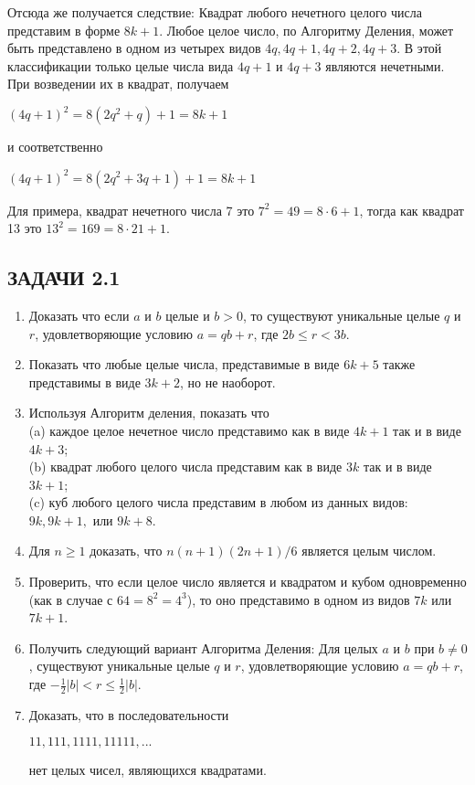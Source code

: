 \documentclass[11pt]{article}
\begin{document}
\qquad \quad Отсюда же получается следствие: Квадрат любого нечетного целого числа представим в форме $8k+1$. Любое целое число, по Алгоритму Деления, может быть представлено в одном из четырех видов $4q, 4q+1, 4q+2, 4q+3$. В этой классификации только целые числа вида $4q+1$ и $4q+3$ являются нечетными. При возведении их в квадрат, получаем
\begin{center}
	$(4q+1)^2=8(2q^2+q)+1=8k+1$
\end{center}
и соответственно
\begin{center}
	$(4q+1)^2=8(2q^2+3q+1)+1=8k+1$
\end{center}
Для примера, квадрат нечетного числа 7 это $7^2=49=8\cdot 6+1$, тогда как квадрат 13 это $13^2=169=8\cdot 21+1$.
\begin{center}
	\section*{ЗАДАЧИ 2.1}
\end{center}
\begin{enumerate}\leftskip=-0.9cm \rightskip=-0.9cm
	\item Доказать что если $a$ и $b$ целые и $b>0$, то существуют уникальные целые $q$ и $r$, удовлетворяющие условию $a=qb+r$, где $2b\leq r<3b$. 
	\item Показать что любые целые числа, представимые в виде $6k+5$ также представимы в виде $3k+2$, но не наоборот.
	\item Используя Алгоритм деления, показать что \\
	(a)\; каждое целое нечетное число представимо как в виде $4k+1$ так и в виде $4k+3$;\\
	(b)\; квадрат любого целого числа представим как в виде $3k$ так и в виде $3k+1$;\\
	(c)\; куб любого целого числа представим в любом из данных видов: $9k, 9k+1,$ или $9k+8$.
	\item Для $n\geq 1$ доказать, что $n(n+1)(2n+1)/6$ является целым числом.
	\item Проверить, что если целое число является и квадратом и кубом одновременно (как в случае с $64=8^2=4^3$), то оно представимо в одном из видов $7k$ или $7k+1$.
	\item Получить следующий вариант Алгоритма Деления: Для целых $a$ и $b$ при $b\neq 0$, существуют уникальные целые $q$ и $r$, удовлетворяющие условию $a=qb+r$, где $-\frac{1}{2}|b|<r\leq \frac{1}{2}|b|$.\; [\textit{Подсказка:} Сначала следует записать $a=q'b+r'$, где $0\leq r'<|b|$. При $0\leq r'\leq \frac{1}{2}|b|$, пусть $r=r'$ и $q=q'$; при $\frac{1}{2}b<r'<|b|$, пусть $r=r'-|b|$ и $q=q'+1$, если $b>0$ или $q=q'-1$, если $b<0$.]
	\item Доказать, что в последовательности
	\begin{center}
		$11, 111, 1111, 11111,...$
	\end{center}
	нет целых чисел, являющихся квадратами.\; [\textit{Подсказка:} Выражение $111...111$ может быть записано как $111...111=111...108+3=4k+3$.]
\end{enumerate}
\thispagestyle{4}
\end{document}
